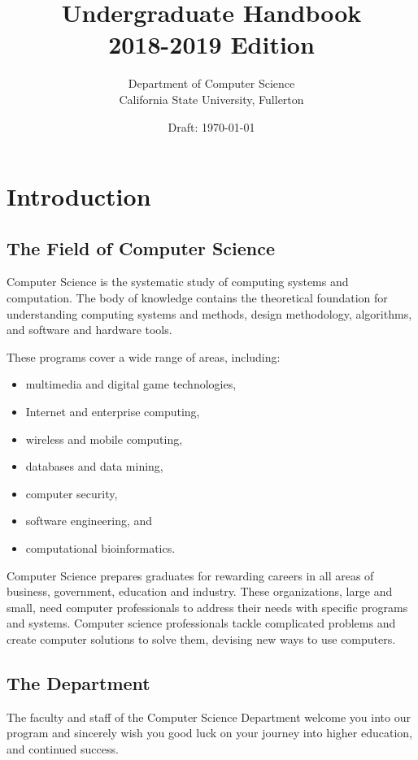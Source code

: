 \documentclass{book}
\begin{document}
\title{Undergraduate Handbook \\ 2018-2019 Edition}
\author{Department of Computer Science \\ California State University, Fullerton}
\date{Draft: \today}
\maketitle

\newpage
\tableofcontents

\chapter{Introduction}

\section{The Field of Computer Science}
Computer Science is the systematic study of computing systems and computation. The body of knowledge contains the theoretical foundation for understanding computing systems and methods, design methodology, algorithms, and software and hardware tools.

These programs cover a wide range of areas, including:
\begin{itemize}
\item multimedia and digital game technologies,
\item Internet and enterprise computing,
\item wireless and mobile computing,
\item databases and data mining,
\item computer security,
\item software engineering, and
\item computational bioinformatics.
\end{itemize}

Computer Science prepares graduates for rewarding careers in all areas of business, government, education and industry. These organizations, large and small, need computer professionals to address their needs with specific programs and systems. Computer science professionals tackle complicated problems and create computer solutions to solve them, devising new ways to use computers.

\section{The Department}
\label{section:the_department}
The faculty and staff of the Computer Science Department welcome you into our program and sincerely wish you good luck on your journey into higher education, and continued success.
\end{document}
